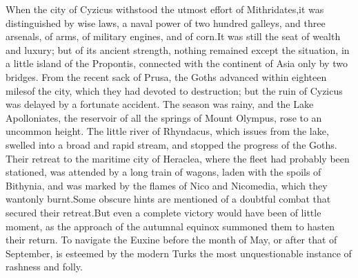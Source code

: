 



When the city of Cyzicus withstood the utmost effort of
Mithridates,\footnotemark[114] it was distinguished by wise laws, a naval power
of two hundred galleys, and three arsenals, of arms, of military
engines, and of corn.\footnotemark[115] It was still the seat of wealth and
luxury; but of its ancient strength, nothing remained except the
situation, in a little island of the Propontis, connected with
the continent of Asia only by two bridges. From the recent sack
of Prusa, the Goths advanced within eighteen miles\footnotemark[116] of the
city, which they had devoted to destruction; but the ruin of
Cyzicus was delayed by a fortunate accident. The season was
rainy, and the Lake Apolloniates, the reservoir of all the
springs of Mount Olympus, rose to an uncommon height. The little
river of Rhyndacus, which issues from the lake, swelled into a
broad and rapid stream, and stopped the progress of the Goths.
Their retreat to the maritime city of Heraclea, where the fleet
had probably been stationed, was attended by a long train of
wagons, laden with the spoils of Bithynia, and was marked by the
flames of Nico and Nicomedia, which they wantonly burnt.\footnotemark[117] Some
obscure hints are mentioned of a doubtful combat that secured
their retreat.\footnotemark[118] But even a complete victory would have been of
little moment, as the approach of the autumnal equinox summoned
them to hasten their return. To navigate the Euxine before the
month of May, or after that of September, is esteemed by the
modern Turks the most unquestionable instance of rashness and
folly.\footnotemark[119]





